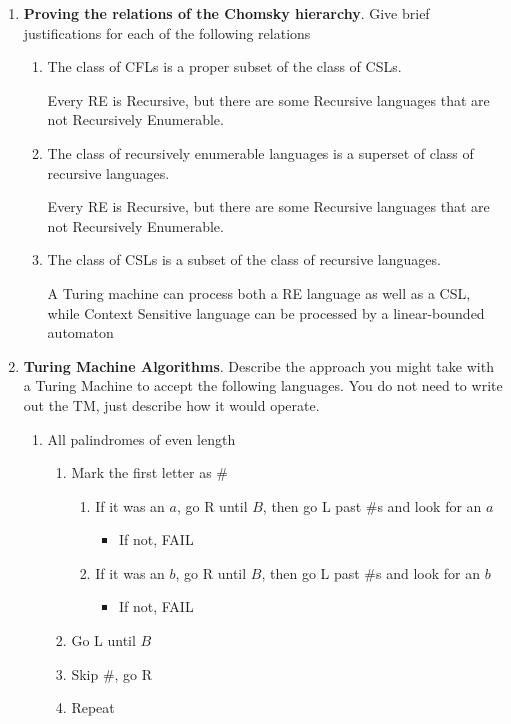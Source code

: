 \documentclass[12pt]{scrbook}
\begin{document}
\begin{enumerate}
  \item \textbf{Proving the relations of the Chomsky hierarchy}.  Give brief
    justifications for each of the following relations
    \begin{enumerate}
      \item The class of CFLs is a proper subset of the class of CSLs.

        Every RE is Recursive, but there are some Recursive languages that are
        not Recursively Enumerable.

      \item The class of recursively enumerable languages is a superset of class of recursive languages.

        Every RE is Recursive, but there are some Recursive languages that are
        not Recursively Enumerable.

      \item The class of CSLs is a subset of the class of recursive languages.

        A Turing machine can process both a RE language as well as a CSL, while
        Context Sensitive language can be processed by a linear-bounded automaton

    \end{enumerate}
  \item \textbf{Turing Machine Algorithms}.  Describe the approach you might take with a
    Turing Machine to accept the following languages. You do not need to
    write out the TM, just describe how it would operate.
      \begin{enumerate}
        \item All palindromes of even length

          \begin{enumerate}
            \item Mark the first letter as \#
              \begin{enumerate}
                \item If it was an $a$, go R until $B$, then go L past \#s and look for an $a$
                  \begin{itemize}
                    \item If not, FAIL
                  \end{itemize}
                \item If it was an $b$, go R until $B$, then go L past \#s and look for an $b$
                  \begin{itemize}
                    \item If not, FAIL
                  \end{itemize}
              \end{enumerate}
            \item Go L until $B$
            \item Skip \#, go R
            \item Repeat
          \end{enumerate}


\end{enumerate}
\end{enumerate}
\end{document}
